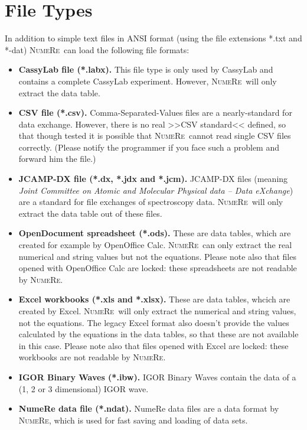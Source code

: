 \documentclass[DIV=14,headsepline,footsepline]{scrbook}
\newcommand{\NR}{\textsc{Nu\-me\-Re}}
\begin{document}
			\section{File Types}
				In addition to simple text files in ANSI format (using the file extensions *.txt and *-dat) \NR\ can load the following file formats:
				\begin{itemize}
					\item \textbf{CassyLab file (*.labx).} This file type is only used by CassyLab and contains a complete CassyLab experiment. However, \NR\ will only extract the data table.
					\item \textbf{CSV file (*.csv).} Comma-Separated-Values files are a nearly-standard for data exchange. However, there is no real >>CSV standard<< defined, so that though tested it is possible that \NR\ cannot read single CSV files correctly. (Please notify the programmer if you face such a problem and forward him the file.)
					\item \textbf{JCAMP-DX file (*.dx, *.jdx and *.jcm).} JCAMP-DX files (meaning \emph{Joint Committee on Atomic and Molecular Physical data -- Data eXchange}) are a standard for file exchanges of spectroscopy data. \NR\ will only extract the data table out of these files.
					\item \textbf{OpenDocument spreadsheet (*.ods).} These are data tables, which are created for example by OpenOffice Calc. \NR\ can only extract the real numerical and string values but not the equations. Please note also that files opened with OpenOffice Calc are locked: these spreadsheets are not readable by \NR.
					\item \textbf{Excel workbooks (*.xls and *.xlsx).} These are data tables, whcich are created by Excel. \NR\ will only extract the numerical and string values, not the equations. The legacy Excel format also doesn't provide the values calculated by the equations in the data tables, so that these are not available in this case. Please note also that files opened with Excel are locked: these workbooks are not readable by \NR.
					\item \textbf{IGOR Binary Waves (*.ibw).} IGOR Binary Waves contain the data of a (1, 2 or 3 dimensional) IGOR wave.
					\item \textbf{NumeRe data file (*.ndat).} NumeRe data files are a data format by \NR, which is used for fast saving and loading of data sets.
				\end{itemize}
				
\end{document}
